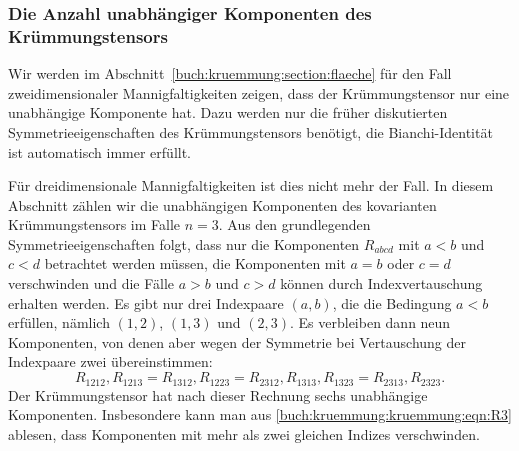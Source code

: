 %
%
\subsubsection{Die Anzahl unabhängiger Komponenten des Krümmungstensors}
Wir werden im Abschnitt~\ref{buch:kruemmung:section:flaeche} für den Fall
zweidimensionaler Mannigfaltigkeiten zeigen, dass der Krümmungstensor
nur eine unabhängige Komponente hat.
Dazu werden nur die früher diskutierten Symmetrieeigenschaften des
Krümmungstensors benötigt, die Bianchi-Identität ist automatisch immer
erfüllt.

Für dreidimensionale Mannigfaltigkeiten ist dies nicht mehr der Fall.
In diesem Abschnitt zählen wir die unabhängigen Komponenten des
kovarianten Krümmungstensors im Falle $n=3$.
Aus den grundlegenden Symmetrieeigenschaften folgt, dass nur die
Komponenten $R_{abcd}$ mit $a<b$ und $c<d$ betrachtet werden müssen,
die Komponenten mit $a=b$ oder $c=d$ verschwinden und die Fälle
$a>b$ und $c>d$ können durch Indexvertauschung erhalten werden.
Es gibt nur drei Indexpaare $(a,b)$, die die Bedingung $a<b$
erfüllen, nämlich $(1,2)$, $(1,3)$ und $(2,3)$.
Es verbleiben dann neun Komponenten, von denen aber wegen der
Symmetrie bei Vertauschung der Indexpaare zwei übereinstimmen:
\begin{equation}
R_{1212},
R_{1213} = R_{1312},
R_{1223} = R_{2312},
R_{1313},
R_{1323} = R_{2313},
R_{2323}.
\label{buch:kruemmung:kruemmung:eqn:R3}
\end{equation}
Der Krümmungstensor hat nach dieser Rechnung sechs unabhängige Komponenten.
Insbesondere kann man aus \eqref{buch:kruemmung:kruemmung:eqn:R3} ablesen,
dass Komponenten mit mehr als zwei gleichen Indizes verschwinden.

